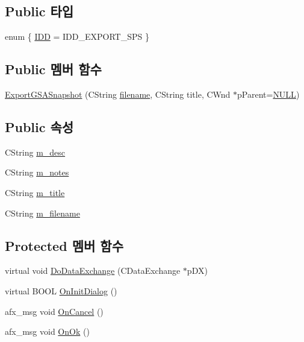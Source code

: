 \subsection*{Public 타입}
\begin{DoxyCompactItemize}
\item 
enum \{ \mbox{\hyperlink{class_export_g_s_a_snapshot_ab3257151782aa1db395f22cd47b06c28a85cd9fd1305aaa3351e6c2d68d18b97e}{I\+DD}} = I\+D\+D\+\_\+\+E\+X\+P\+O\+R\+T\+\_\+\+S\+PS
 \}
\end{DoxyCompactItemize}
\subsection*{Public 멤버 함수}
\begin{DoxyCompactItemize}
\item 
\mbox{\hyperlink{class_export_g_s_a_snapshot_ae7d2ef11752f80bfd3c3a13a7c1215ad}{Export\+G\+S\+A\+Snapshot}} (C\+String \mbox{\hyperlink{_test_emu_8cpp_ac33a174c39700095ca0f892624d85a3f}{filename}}, C\+String title, C\+Wnd $\ast$p\+Parent=\mbox{\hyperlink{_system_8h_a070d2ce7b6bb7e5c05602aa8c308d0c4}{N\+U\+LL}})
\end{DoxyCompactItemize}
\subsection*{Public 속성}
\begin{DoxyCompactItemize}
\item 
C\+String \mbox{\hyperlink{class_export_g_s_a_snapshot_afbd1310c7508cf3620cdc29dcb5871cc}{m\+\_\+desc}}
\item 
C\+String \mbox{\hyperlink{class_export_g_s_a_snapshot_ac070b8dc915716aad113bae269ce6e97}{m\+\_\+notes}}
\item 
C\+String \mbox{\hyperlink{class_export_g_s_a_snapshot_a8e7e31444aaab44e9216958e17fceb5d}{m\+\_\+title}}
\item 
C\+String \mbox{\hyperlink{class_export_g_s_a_snapshot_a517746214715c32e5a153b44a80bf79e}{m\+\_\+filename}}
\end{DoxyCompactItemize}
\subsection*{Protected 멤버 함수}
\begin{DoxyCompactItemize}
\item 
virtual void \mbox{\hyperlink{class_export_g_s_a_snapshot_a892a749aacc888d1408cb8fb85c950c9}{Do\+Data\+Exchange}} (C\+Data\+Exchange $\ast$p\+DX)
\item 
virtual B\+O\+OL \mbox{\hyperlink{class_export_g_s_a_snapshot_a1fb347339492a091f3a550767b16ed06}{On\+Init\+Dialog}} ()
\item 
afx\+\_\+msg void \mbox{\hyperlink{class_export_g_s_a_snapshot_a233d4db37eebfb2286379e5ffe757667}{On\+Cancel}} ()
\item 
afx\+\_\+msg void \mbox{\hyperlink{class_export_g_s_a_snapshot_ae057bb5c974df748b1adedfc5bcdca58}{On\+Ok}} ()
\end{DoxyCompactItemize}


